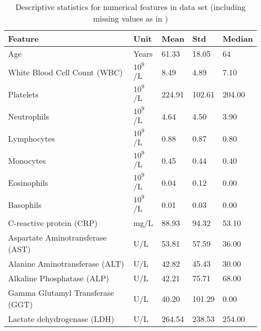 \begin{table}
\centering
\begin{tabular}{lllll}
Feature                          & Unit                    & Mean   & Std    & 
Median \\ \hline
Age                              & Years                   & 61.33  & 18.05  & 
64     \\
White Blood Cell Count (WBC)     & $10^9$/L & 8.49   & 4.89   & 
7.10   \\
Platelets                        & $10^9$/L & 224.91  & 102.61  & 
204.00 \\
Neutrophils                      & $10^9$/L & 4.64   & 4.50   & 
3.90   \\
Lymphocytes                      & $10^9$/L & 0.88   & 0.87   & 
0.80   \\
Monocytes                        & $10^9$/L & 0.45   & 0.44   & 
0.40   \\
Eosinophils                      & $10^9$/L & 0.04   & 0.12   & 
0.00   \\
Basophils                        & $10^9$/L & 0.01   & 0.03   & 
0.00   \\
C-reactive protein (CRP)         & mg/L                    & 88.93  & 94.32  & 
53.10  \\
Aspartate Aminotransferase (AST) & U/L                     & 53.81  & 57.59  & 
36.00  \\
Alanine Aminotransferase (ALT)   & U/L                     & 42.82  & 45.43  & 
30.00  \\
Alkaline Phosphatase (ALP)       & U/L                     & 42.21  & 75.71  & 
68.00  \\
Gamma Glutamyl Transferase (GGT) & U/L                     & 40.20  & 101.29 & 
0.00  \\
Lactate dehydrogenase (LDH)      & U/L                     & 264.54 & 238.53 
& 254.00
\end{tabular}
\caption{Descriptive statistics for numerical features in data set (including 
missing values as in \cite{RN127})}
\label{tab:feature-dist-NAN}
\end{table}

